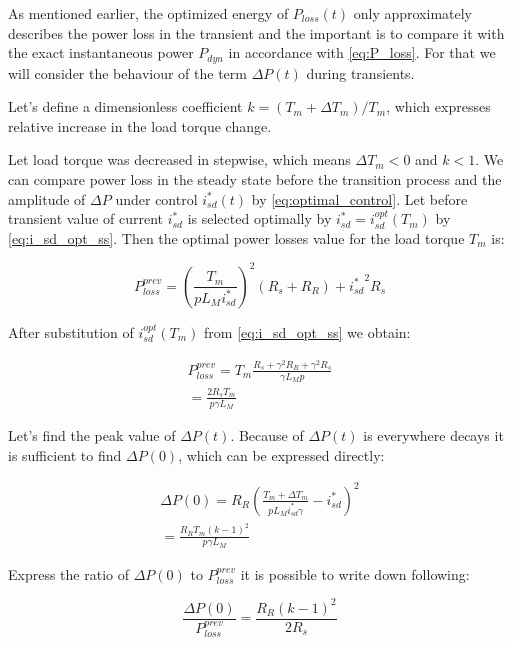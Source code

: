 \documentclass[journal]{IEEEtran}
\begin{document}
As mentioned earlier, the optimized energy of $P_{loss}(t)$ only approximately describes the power loss in the transient and the important is to compare it with the exact instantaneous power $P_{dyn}$ in accordance with \eqref{eq:P_loss}. For that we will consider the behaviour of the term $\Delta P(t)$ during transients. 

Let's define a dimensionless coefficient $k = (T_m+\Delta T_m)/T_m$, which expresses relative increase in the load torque change.

Let load torque was decreased in stepwise, which means $\Delta T_m < 0$ and $k < 1$. We can compare power loss in the steady state before the transition process and the amplitude of $\Delta P$ under control $i_{sd}^*(t)$ by \eqref{eq:optimal_control}. Let before transient value of current $i_{sd}^*$ is selected optimally by $i_{sd}^* = i_{sd}^{opt}(T_m)$ by \eqref{eq:i_sd_opt_ss}. Then the optimal power losses value for the load torque $T_m$ is:

\begin{equation}
P_{loss}^{prev} = \left ( \frac{T_m}{p L_M i_{sd}^*} \right )^2 (R_s + R_R) + {i_{sd}^*}^2 R_s
\end{equation}

After substitution of $i_{sd}^{opt}(T_m)$ from \eqref{eq:i_sd_opt_ss} we obtain:

\begin{equation}
\begin{gathered}
P_{loss}^{prev} = T_m \frac{R_s + \gamma^2 R_R + \gamma^2 R_s}{\gamma L_M p} \\
= \frac{2 R_s T_m}{p \gamma L_M}
\end{gathered}
\end{equation}

Let's find the peak value of $\Delta P(t)$. Because of $\Delta P(t)$ is everywhere decays it is sufficient to find $\Delta P(0)$, which can be expressed directly:

\begin{equation}
\begin{gathered}
\Delta P(0) = R_R \left ( \frac{T_m+\Delta T_m}{p L_M i_{sd}^* \gamma} - i_{sd}^* \right )^2 \\
= \frac{R_R T_m (k - 1)^2}{p \gamma L_M}
\end{gathered}
\end{equation}

Express the ratio of $\Delta P(0)$ to $P_{loss}^{prev}$ it is possible to write down following:

\begin{equation}
\frac{\Delta P(0)}{P_{loss}^{prev}} = \frac{R_R (k - 1)^2}{2 R_s}
\end{equation}
\end{document}
